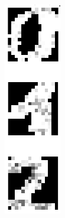 \documentclass[10pt,a4paper]{article}
\begin{document}
\begin{figure}[htb]
\begin{minipage}{0.08\textwidth}
\end{minipage}%
\begin{minipage}{0.08\textwidth}
\includegraphics[width=\textwidth]{figs/partially_reconstructed.png}

\end{minipage}
\end{figure}
\end{document}
